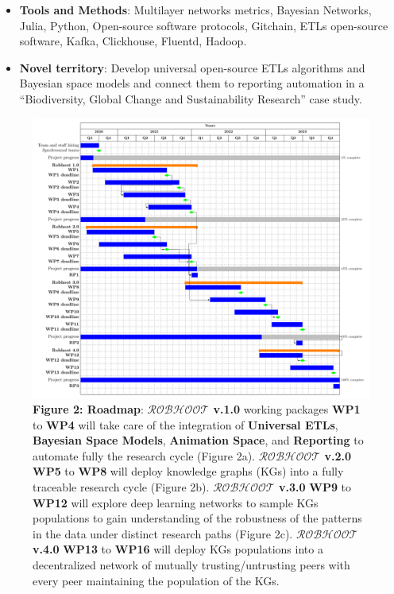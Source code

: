 \documentclass[12pt, a4paper]{article} %
\begin{document}
   \begin{itemize}
   \item {\bf Tools and Methods}: Multilayer networks metrics,
     Bayesian Networks, Julia, Python, Open-source software protocols,
     Gitchain, ETLs open-source software, Kafka, Clickhouse, Fluentd,
     Hadoop.
   \end{itemize}

     
    \begin{itemize}
    \item {\bf Novel territory}: Develop universal open-source ETLs
      algorithms and Bayesian space models and connect them to
      reporting automation in a ``Biodiversity, Global Change and
      Sustainability Research'' case study.
   \end{itemize}

 \begin{figure}[h!]
  \includegraphics[width=1\textwidth]{Figures/GanttChart.pdf}
  {\small {\bf Figure 2: Roadmap}: {\bf $\mathcal{ROBHOOT}$ v.1.0}
    working packages {\bf WP1} to {\bf WP4} will take care of the
    integration of {\bf Universal ETLs}, {\bf Bayesian Space Models},
    {\bf Animation Space}, and {\bf Reporting} to automate fully the
    research cycle (Figure 2a). {\bf $\mathcal{ROBHOOT}$ v.2.0} {\bf
      WP5} to {\bf WP8} will deploy knowledge graphs (KGs) into a
    fully traceable research cycle (Figure 2b). {\bf
      $\mathcal{ROBHOOT}$ v.3.0} {\bf WP9} to {\bf WP12} will explore
    deep learning networks to sample KGs populations to gain
    understanding of the robustness of the patterns in the data under
    distinct research paths (Figure 2c). {\bf $\mathcal{ROBHOOT}$
      v.4.0} {\bf WP13} to {\bf WP16} will deploy KGs populations into
    a decentralized network of mutually trusting/untrusting peers with
    every peer maintaining the population of the KGs.}
\end{figure}
\end{document}
